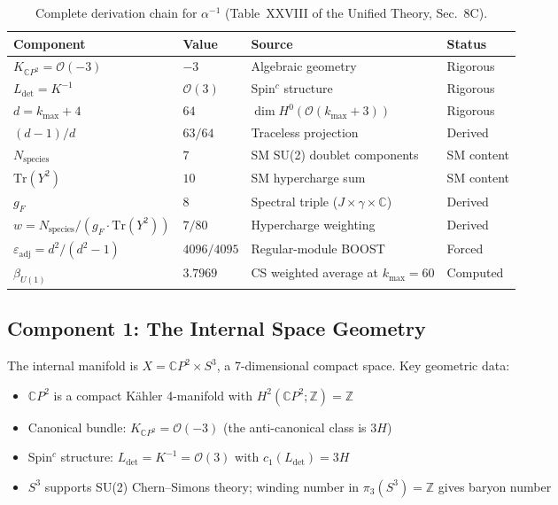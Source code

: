 \documentclass[12pt,a4paper]{article}
\begin{document}
\begin{table}[h]
\centering
\caption{Complete derivation chain for $\alpha^{-1}$
(Table~XXVIII of the Unified Theory, Sec.~8C).}
\label{tab:chain}
\renewcommand{\arraystretch}{1.3}
\begin{tabular}{llll}
\toprule
\textbf{Component} & \textbf{Value} & \textbf{Source} & \textbf{Status} \\
\midrule
$K_{\mathbb{C}P^2} = \mathcal{O}(-3)$ & $-3$
  & Algebraic geometry & Rigorous \\
$L_{\det} = K^{-1}$ & $\mathcal{O}(3)$
  & Spin$^c$ structure & Rigorous \\
$d = k_{\max} + 4$ & $64$
  & $\dim H^0(\mathcal{O}(k_{\max}+3))$ & Rigorous \\
$(d-1)/d$ & $63/64$
  & Traceless projection & Derived \\
$N_{\mathrm{species}}$ & $7$
  & SM SU(2) doublet components & SM content \\
$\mathrm{Tr}(Y^2)$ & $10$
  & SM hypercharge sum & SM content \\
$g_F$ & $8$
  & Spectral triple ($J \times \gamma \times \mathbb{C}$) & Derived \\
$w = N_{\mathrm{species}}/(g_F \cdot \mathrm{Tr}(Y^2))$ & $7/80$
  & Hypercharge weighting & Derived \\
$\varepsilon_{\mathrm{adj}} = d^2/(d^2-1)$ & $4096/4095$
  & Regular-module BOOST & Forced \\
$\beta_{U(1)}$ & $3.7969$
  & CS weighted average at $k_{\max}=60$ & Computed \\
\bottomrule
\end{tabular}
\end{table}

\subsection{Component 1: The Internal Space Geometry}

The internal manifold is $X = \mathbb{C}P^2 \times S^3$, a
7-dimensional compact space. Key geometric data:

\begin{itemize}
\item $\mathbb{C}P^2$ is a compact K\"ahler 4-manifold with
  $H^2(\mathbb{C}P^2;\mathbb{Z}) = \mathbb{Z}$
\item Canonical bundle: $K_{\mathbb{C}P^2} = \mathcal{O}(-3)$
  (the anti-canonical class is $3H$)
\item Spin$^c$ structure: $L_{\det} = K^{-1} = \mathcal{O}(3)$
  with $c_1(L_{\det}) = 3H$
\item $S^3$ supports SU(2) Chern--Simons theory; winding number
  in $\pi_3(S^3) = \mathbb{Z}$ gives baryon number
\end{itemize}
\end{document}
